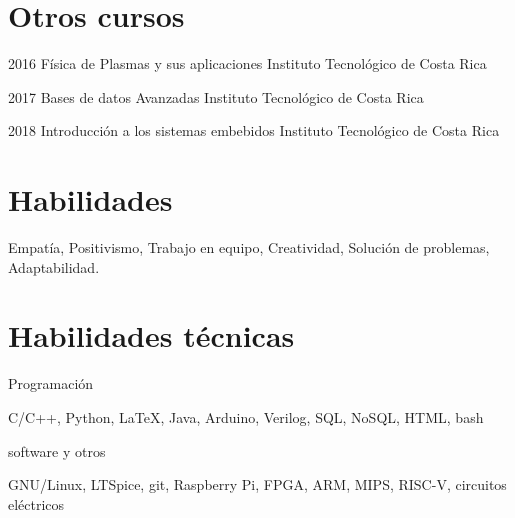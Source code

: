 \documentclass[]{friggeri-cv} %
\begin{document}

\section{Otros cursos}

\begin{entrylist}


\entry
{2016}
{Física de Plasmas y sus aplicaciones}
{Instituto Tecnológico de Costa Rica} 
{} 
{}


\entry
{2017}
{Bases de datos Avanzadas}
{Instituto Tecnológico de Costa Rica} 
{} 
{}

\entry
{2018}
{Introducción a los sistemas embebidos}
{Instituto Tecnológico de Costa Rica} 
{} 
{}


\end{entrylist}


\section{Habilidades}
  \vspace{-0.2cm}

Empatía, Positivismo, Trabajo en equipo, Creatividad, Solución de problemas, Adaptabilidad.



\section{Habilidades técnicas}

\begin{entrylist}


\entry
{}
{Programación}
{}
{}
{
C/C++, Python, \LaTeX, Java, Arduino, Verilog, SQL, NoSQL, HTML, bash

}


\entry
{}
{software y otros}
{}
{}
{
GNU/Linux, LTSpice, git, Raspberry Pi, FPGA, ARM, MIPS, RISC-V, circuitos eléctricos

}


\end{entrylist}
\end{document}
